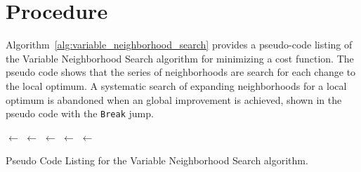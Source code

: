 \documentclass[a4paper, 11pt]{article}
\begin{document}
\section{Procedure}
\label{sec:procedure}
Algorithm~\ref{alg:variable_neighborhood_search} provides a pseudo-code listing of the Variable Neighborhood Search algorithm for minimizing a cost function.
The pseudo code shows that the series of neighborhoods are search for each change to the local optimum. A systematic search of expanding neighborhoods for a local optimum is abandoned when an global improvement is achieved, shown in the pseudo code with the \texttt{Break} jump.

\begin{algorithm}[ht]
	\SetLine

	\KwIn{\Neighborhoods}
	\KwOut{\Best}
	\Best $\leftarrow$ \RandomSolution{}\;
	\While{$\neg$ \StopCondition{}} {
		\ForEach{\CurrentNeighborhood $\in$ \Neighborhoods} {
			\Neighborhood $\leftarrow$ \CalculateNeighborhood{\Best, \CurrentNeighborhood}\;
			\Candidate $\leftarrow$ \RandomSolutionInNeighborhood{\Neighborhood}\;
			\Candidate $\leftarrow$ \LocalSearch{\Candidate}\;
			\If{\Cost{\Candidate} $<$ \Cost{\Best}} {
				\Best $\leftarrow$ \Candidate\;
				\Break\;
			}
		}
	}
	\Return{\Best}\;
	\caption{Pseudo Code Listing for the Variable Neighborhood Search algorithm.}
	\label{alg:variable_neighborhood_search}
\end{algorithm}
\end{document}
